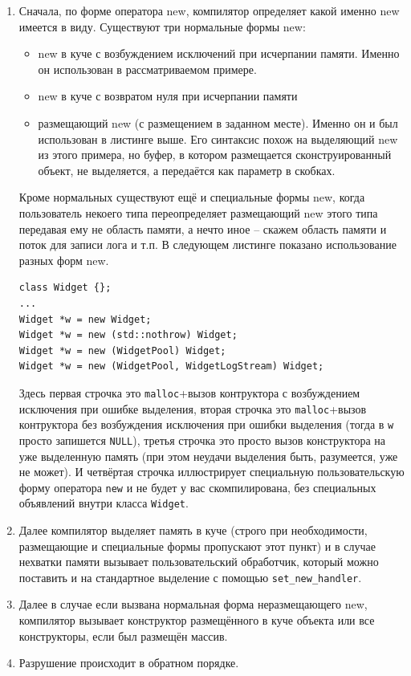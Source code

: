 \documentclass[a4paper,12pt,oneside]{article}
\begin{document}
\begin{enumerate}
\item
Сначала, по форме оператора new, компилятор определяет какой именно new имеется в виду. Существуют три нормальные формы new:
\begin{itemize}
\item
new в куче с возбуждением исключений при исчерпании памяти. Именно он использован в рассматриваемом примере.
\item
new в куче с возвратом нуля при исчерпании памяти
\item
размещающий new (с размещением в заданном месте). Именно он и был использован в листинге выше. Его синтаксис похож на выделяющий new из этого примера, но буфер, в котором размещается сконструированный объект, не выделяется, а передаётся как параметр в скобках.
\end{itemize}

Кроме нормальных существуют ещё и специальные формы new, когда пользователь некоего типа переопределяет размещающий new этого типа передавая ему не область памяти, а нечто иное -- скажем область памяти и поток для записи лога и т.п. В следующем листинге показано использование разных форм new.

\begin{lstlisting}
class Widget {};
...
Widget *w = new Widget;
Widget *w = new (std::nothrow) Widget;
Widget *w = new (WidgetPool) Widget;
Widget *w = new (WidgetPool, WidgetLogStream) Widget;
\end{lstlisting}

Здесь первая строчка это \lstinline!malloc!+вызов контруктора с возбуждением исключения при ошибке выделения, вторая строчка это \lstinline!malloc!+вызов контруктора без возбуждения исключения при ошибки выделения (тогда в \lstinline!w! просто запишется \lstinline!NULL!), третья строчка это просто вызов конструктора на уже выделенную память (при этом неудачи выделения быть, разумеется, уже не может). И четвёртая строчка иллюстрирует специальную пользовательскую форму оператора \lstinline!new! и не будет у вас скомпилирована, без специальных объявлений внутри класса \lstinline!Widget!.

\item
Далее компилятор выделяет память в куче (строго при необходимости, размещающие и специальные формы пропускают этот пункт) и в случае нехватки памяти вызывает пользовательский обработчик, который можно поставить и на стандартное выделение с помощью \lstinline!set_new_handler!.
\item
Далее в случае если вызвана нормальная форма неразмещающего new, компилятор вызывает конструктор размещённого в куче объекта или все конструкторы, если был размещён массив.
\item
Разрушение происходит в обратном порядке.
\end{enumerate}
\end{document}
